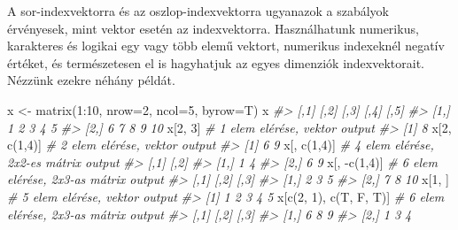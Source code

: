 \documentclass[
]{book}
\newenvironment{Shaded}{\begin{snugshade}}{\end{snugshade}}
\newcommand{\AttributeTok}[1]{\textcolor[rgb]{0.77,0.63,0.00}{#1}}
\newcommand{\CommentTok}[1]{\textcolor[rgb]{0.56,0.35,0.01}{\textit{#1}}}
\newcommand{\DecValTok}[1]{\textcolor[rgb]{0.00,0.00,0.81}{#1}}
\newcommand{\FunctionTok}[1]{\textcolor[rgb]{0.00,0.00,0.00}{#1}}
\newcommand{\NormalTok}[1]{#1}
\newcommand{\OtherTok}[1]{\textcolor[rgb]{0.56,0.35,0.01}{#1}}
\newcommand{\SpecialCharTok}[1]{\textcolor[rgb]{0.00,0.00,0.00}{#1}}
\begin{document}
A sor-indexvektorra és az oszlop-indexvektorra ugyanazok a szabályok érvényesek, mint vektor esetén az indexvektorra. Használhatunk numerikus, karakteres és logikai egy vagy több elemű vektort, numerikus indexeknél negatív értéket, és természetesen el is hagyhatjuk az egyes dimenziók indexvektorait. Nézzünk ezekre néhány példát.

\begin{Shaded}
\begin{Highlighting}[]
\NormalTok{x }\OtherTok{\textless{}{-}} \FunctionTok{matrix}\NormalTok{(}\DecValTok{1}\SpecialCharTok{:}\DecValTok{10}\NormalTok{, }\AttributeTok{nrow=}\DecValTok{2}\NormalTok{, }\AttributeTok{ncol=}\DecValTok{5}\NormalTok{, }\AttributeTok{byrow=}\NormalTok{T)}
\NormalTok{x}
\CommentTok{\#\textgreater{}      [,1] [,2] [,3] [,4] [,5]}
\CommentTok{\#\textgreater{} [1,]    1    2    3    4    5}
\CommentTok{\#\textgreater{} [2,]    6    7    8    9   10}
\NormalTok{x[}\DecValTok{2}\NormalTok{, }\DecValTok{3}\NormalTok{]                 }\CommentTok{\# 1 elem elérése, vektor output}
\CommentTok{\#\textgreater{} [1] 8}
\NormalTok{x[}\DecValTok{2}\NormalTok{, }\FunctionTok{c}\NormalTok{(}\DecValTok{1}\NormalTok{,}\DecValTok{4}\NormalTok{)]            }\CommentTok{\# 2 elem elérése, vektor output}
\CommentTok{\#\textgreater{} [1] 6 9}
\NormalTok{x[, }\FunctionTok{c}\NormalTok{(}\DecValTok{1}\NormalTok{,}\DecValTok{4}\NormalTok{)]             }\CommentTok{\# 4 elem elérése, 2x2{-}es mátrix output}
\CommentTok{\#\textgreater{}      [,1] [,2]}
\CommentTok{\#\textgreater{} [1,]    1    4}
\CommentTok{\#\textgreater{} [2,]    6    9}
\NormalTok{x[, }\SpecialCharTok{{-}}\FunctionTok{c}\NormalTok{(}\DecValTok{1}\NormalTok{,}\DecValTok{4}\NormalTok{)]            }\CommentTok{\# 6 elem elérése, 2x3{-}as mátrix output}
\CommentTok{\#\textgreater{}      [,1] [,2] [,3]}
\CommentTok{\#\textgreater{} [1,]    2    3    5}
\CommentTok{\#\textgreater{} [2,]    7    8   10}
\NormalTok{x[}\DecValTok{1}\NormalTok{, ]                  }\CommentTok{\# 5 elem elérése, vektor output}
\CommentTok{\#\textgreater{} [1] 1 2 3 4 5}
\NormalTok{x[}\FunctionTok{c}\NormalTok{(}\DecValTok{2}\NormalTok{, }\DecValTok{1}\NormalTok{), }\FunctionTok{c}\NormalTok{(T, F, T)]  }\CommentTok{\# 6 elem elérése, 2x3{-}as mátrix output}
\CommentTok{\#\textgreater{}      [,1] [,2] [,3]}
\CommentTok{\#\textgreater{} [1,]    6    8    9}
\CommentTok{\#\textgreater{} [2,]    1    3    4}
\end{Highlighting}
\end{Shaded}
\end{document}
